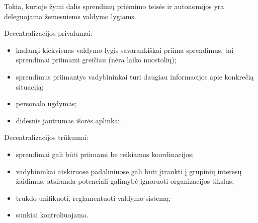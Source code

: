\begin{defn}
  Tokia, kurioje žymi dalis sprendimų priėmimo teisės ir autonomijos
  yra deleguojama žemesniems valdymo lygiams.
\end{defn}

Decentralizacijos privalumai:
\begin{itemize}
  \item kadangi kiekvienas valdymo lygis savarankiškai priima sprendimus,
    tai sprendimai priimami greičiau (nėra laiko nuostolių);
  \item sprendimus priimantys vadybininkai turi daugiau informacijos
    apie konkrečią situaciją;
  \item personalo ugdymas;
  \item didesnis jautrumas išorės aplinkai.
\end{itemize}

Decentralizacijos trūkumai:
\begin{itemize}
  \item sprendimai gali būti priimami be reikiamos koordinacijos;
  \item vadybininkai atskiruose padaliniuose gali būti įtraukti į
    grupinių interesų žaidimus, atsiranda potenciali galimybė
    ignoruoti organizacijos tikslus;
  \item trukdo unifikuoti, reglamentuoti valdymo sistemą;
  \item sunkiai kontroliuojama.
\end{itemize}
